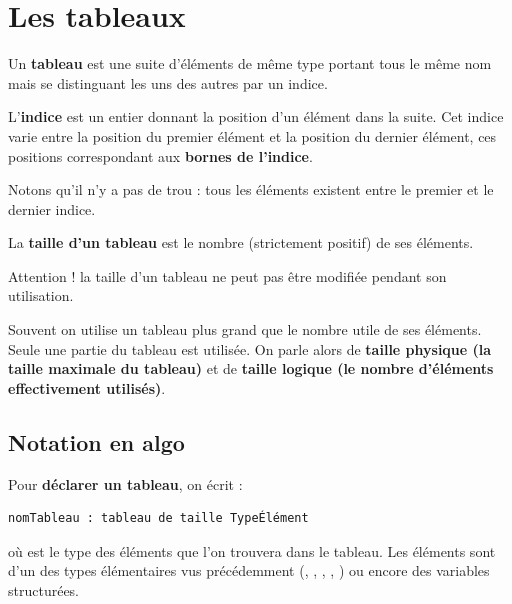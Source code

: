 \documentclass[11pt,a4paper]{article}
\begin{document}
            \section{Les tableaux}
        Un \textbf{tableau} est une suite d'\'el\'ements de m\^eme type 
        portant tous le m\^eme nom mais se distinguant les uns des autres par un indice.
      
            \par
        
        L'\textbf{indice} est un entier donnant la position d'un \'el\'ement dans la suite. 
        Cet indice varie entre la position du premier \'el\'ement et la position du dernier \'el\'ement, 
        ces positions correspondant aux \textbf{bornes de l'indice}. \par
				
        Notons qu'il n'y a pas de \guillemotleft  trou \guillemotright  : tous les \'el\'ements existent entre le premier et le dernier indice.
      
            \par
        
        La \textbf{taille d'un tableau} est le nombre (strictement positif) de ses \'el\'ements. \par
				
        Attention ! la taille d'un tableau ne peut pas \^etre modifi\'ee pendant son utilisation.
      
            \par
        
        Souvent on utilise un tableau plus grand que le nombre utile de ses \'el\'ements. 
        Seule une partie du tableau est utilis\'ee. 
        On parle alors de \textbf{taille physique (la taille maximale du tableau)} et
        de \textbf{taille logique (le nombre d'\'el\'ements effectivement utilis\'es)}.
		
            \par
        \subsection{Notation en algo}
        Pour \textbf{d\'eclarer un tableau}, on \'ecrit :
      
            \par
        \begin{verbatim}
nomTableau : tableau de taille TypeÉlément
      \end{verbatim}
        o\`u  est le type des \'el\'ements 
        que l'on trouvera dans le tableau. Les \'el\'ements sont
        d'un des types \'el\'ementaires vus pr\'ec\'edemment 
        (\verb@entier@, , 
        , \verb@chaine@, 
        ) ou encore des variables structur\'ees. 
      
\end{document}
